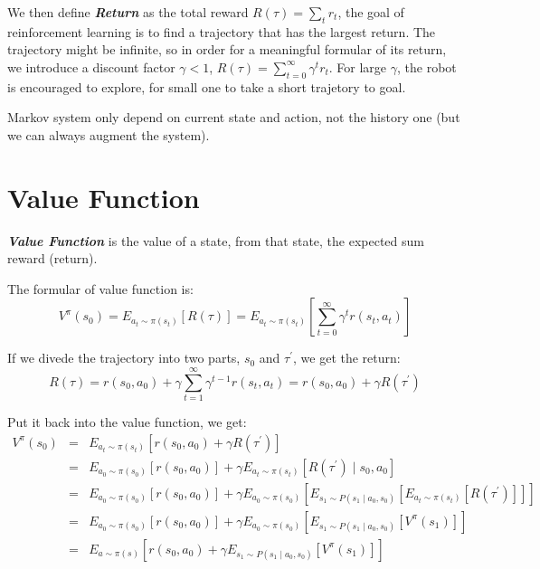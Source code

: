 \documentclass[10pt]{elegantbook}
\newcommand{\mydefination}[1]{\textbf{\textit{\textcolor{structurecolor}{#1}}}}
\begin{document}
We then define \mydefination{Return} as the total reward $R(\tau) = \sum_t r_t$, 
the goal of reinforcement learning is to find a trajectory that has the largest return. The trajectory might be infinite, so in order for a 
meaningful formular of its return, we introduce a discount factor $\gamma < 1$, $R(\tau) = \sum_{t=0}^{\infty}\gamma^tr_t$. For large $\gamma$, 
the robot is encouraged to explore, for small one to take a short trajetory to goal.

Markov system only depend on current state and action, not the history one (but we can always augment the system).

\section{Value Function}
\mydefination{Value Function} is the value of a state, from that state, the expected sum reward (return). 

The formular of value function is:
\begin{equation}
    V^{\pi}(s_0) = E_{a_t \sim \pi(s_t)}[R(\tau)] = E_{a_t \sim \pi(s_t)}\left[ \sum_{t=0}^{\infty}\gamma^tr(s_t, a_t) \right]
\end{equation} 

If we divede the trajectory into two parts, $s_0$ and $\tau^{'}$, we get the return:
\[ R(\tau) = r(s_0, a_0) + \gamma \sum_{t=1}^{\infty}\gamma^{t-1}r(s_t, a_t) = r(s_0, a_0) + \gamma R(\tau^{'}) \]

Put it back into the value function, we get:
\begin{equation}
    \begin{array}{lll}
    V^{\pi}(s_0) &=& E_{a_t \sim \pi(s_t)}[r(s_0, a_0) + \gamma R(\tau^{'})] \\
                 &=& E_{a_0 \sim \pi(s_0)}[r(s_0, a_0)] + \gamma E_{a_t \sim \pi(s_t)}[R(\tau^{'}) \mid s_0, a_0] \\
                 &=& E_{a_0 \sim \pi(s_0)}[r(s_0, a_0)] + \gamma E_{a_0 \sim \pi(s_0)}\left[E_{s_1 \sim P(s_1 \mid a_0, s_0)}[E_{a_t \sim \pi(s_t)}[R(\tau^{'})]]\right] \\ 
                 &=& E_{a_0 \sim \pi(s_0)}[r(s_0, a_0)] + \gamma E_{a_0 \sim \pi(s_0)}\left[E_{s_1 \sim P(s_1 \mid a_0, s_0)}[V^{\pi}(s_1)]\right] \\
                 &=& E_{a \sim \pi(s)}\left[ r(s_0, a_0) + \gamma E_{s_1 \sim P(s_1 \mid a_0, s_0)} [V^{\pi}(s_1)] \right]
    \end{array}
\end{equation}
\end{document}
